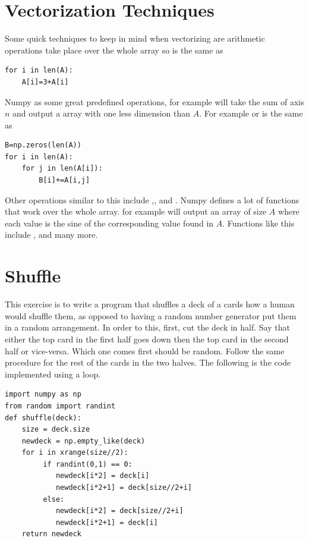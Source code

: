 \section*{Vectorization Techniques}
Some quick techniques to keep in mind when vectorizing are arithmetic operations take place over the whole array so  is the same as 
\begin{lstlisting}
for i in len(A):
	A[i]=3+A[i]
\end{lstlisting}
Numpy as some great predefined operations, for example  will take the sum of axis $n$ and output a array with one less dimension than $A$. For example  or  is the same as
\begin{lstlisting}
B=np.zeros(len(A))
for i in len(A):
	for j in len(A[i]):
		B[i]+=A[i,j]
\end{lstlisting}
Other operations similar to this include ,, and .
Numpy defines a lot of functions that work over the whole array. for example  will output an array of size $A$ where each value is the sine of the corresponding value found in $A$. Functions like this include ,  and many more.

\section*{Shuffle}
This exercise is to write a program that shuffles a deck of a cards how a human would shuffle them, as opposed to having a random number generator put them in a random arrangement.
In order to this, first, cut the deck in half.
Say that either the top card in the first half goes down then the top card in the second half or vice-versa.
Which one comes first should be random.
Follow the same procedure for the rest of the cards in the two halves.
The following is the code implemented using a loop.
\begin{lstlisting}
import numpy as np
from random import randint
def shuffle(deck):
    size = deck.size
    newdeck = np.empty_like(deck)
    for i in xrange(size//2):
         if randint(0,1) == 0:
            newdeck[i*2] = deck[i]
            newdeck[i*2+1] = deck[size//2+i]
         else:
            newdeck[i*2] = deck[size//2+i]
            newdeck[i*2+1] = deck[i]
    return newdeck
\end{lstlisting}

